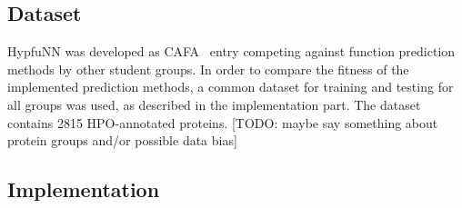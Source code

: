 \subsection{Dataset}

HypfuNN was developed as CAFA~\citep{CAFA} entry competing against function prediction methods by other student groups. In order to compare the fitness of the implemented prediction methods, a common
dataset for training and testing for all groups was used, as described in the implementation part. The dataset contains 2815 HPO-annotated proteins. [TODO: maybe say something about protein groups
and/or possible data bias]

\subsection{Implementation}


